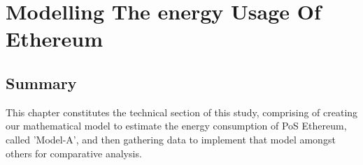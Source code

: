 \chapter{Modelling The energy Usage Of Ethereum}
\label{Modelling}

\section{Summary}

This chapter constitutes the technical section of this study, comprising of creating our mathematical model to estimate the energy consumption of PoS Ethereum, called 'Model-A', and then gathering data to implement that model amongst others for comparative analysis. 




    
    
    
    
